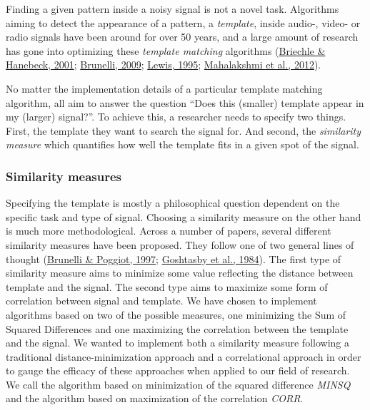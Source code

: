 \documentclass[
  man]{apa7}
\begin{document}
Finding a given pattern inside a noisy signal is not a novel task. Algorithms aiming to detect the appearance of a pattern, a \emph{template}, inside audio-, video- or radio signals have been around for over 50 years, and a large amount of research has gone into optimizing these \emph{template matching} algorithms (\protect\hyperlink{ref-briechle2001template}{Briechle \& Hanebeck, 2001}; \protect\hyperlink{ref-brunelli2009template}{Brunelli, 2009}; \protect\hyperlink{ref-lewis1995fast}{Lewis, 1995}; \protect\hyperlink{ref-mahalakshmi2012image}{Mahalakshmi et al., 2012}).

No matter the implementation details of a particular template matching algorithm, all aim to answer the question ``Does this (smaller) template appear in my (larger) signal?''. To achieve this, a researcher needs to specify two things. First, the template they want to search the signal for. And second, the \emph{similarity measure} which quantifies how well the template fits in a given spot of the signal.

\hypertarget{similarity-measures}{%
\subsubsection{Similarity measures}\label{similarity-measures}}

Specifying the template is mostly a philosophical question dependent on the specific task and type of signal. Choosing a similarity measure on the other hand is much more methodological. Across a number of papers, several different similarity measures have been proposed. They follow one of two general lines of thought (\protect\hyperlink{ref-brunelli1997template}{Brunelli \& Poggiot, 1997}; \protect\hyperlink{ref-goshtasby1984two}{Goshtasby et al., 1984}). The first type of similarity measure aims to minimize some value reflecting the distance between template and the signal. The second type aims to maximize some form of correlation between signal and template. We have chosen to implement algorithms based on two of the possible measures, one minimizing the Sum of Squared Differences and one maximizing the correlation between the template and the signal. We wanted to implement both a similarity measure following a traditional distance-minimization approach and a correlational approach in order to gauge the efficacy of these approaches when applied to our field of research. We call the algorithm based on minimization of the squared difference \emph{MINSQ} and the algorithm based on maximization of the correlation \emph{CORR}.
\end{document}
